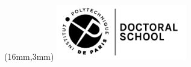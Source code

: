 \newcommand{\logoEd}{ed}																		%
\newcommand{\PhDTitleFR}{Pour un internet des objets sécurisé et respectueux de la vie privée basé sur le contrôle d'usage et les registres distribués}													%
\newcommand{\keywordsFR}{Internet des Objets, Systèmes distribués, Vie privée, Contrôle d'usage, RGPD}														%
\newcommand{\abstractFR}{\lipsum[1-3]}															%

\newcommand{\PhDTitleEN}{For a Private and Secure Internet of Things with Usage Control and Distributed Ledger Technology
}													%
\newcommand{\keywordsEN}{Internet of Things, Distributed Systems, Privacy, Usage Control, GDPR}														%


% 
\pagestyle{empty}

\begin{textblock*}{61mm}(16mm,3mm)
	\noindent\includegraphics[height=24mm]{media/ed/EDIPP-en.png}
\end{textblock*}



